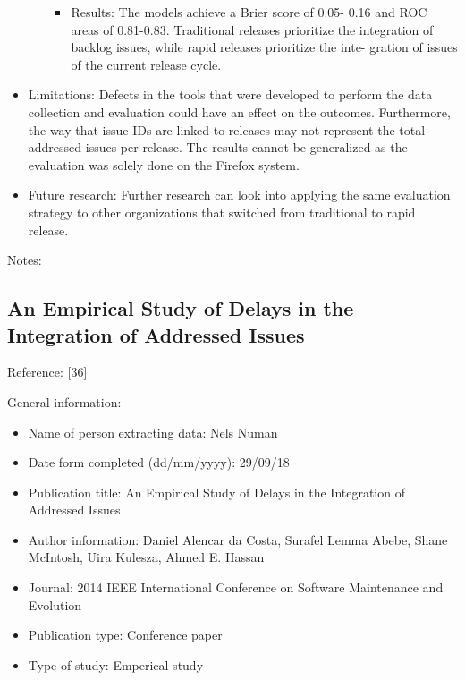 \documentclass[]{book}
\providecommand{\tightlist}{%
  \setlength{\itemsep}{0pt}\setlength{\parskip}{0pt}}
\begin{document}
\begin{itemize}
\begin{itemize}
    \begin{itemize}
    \tightlist
    \item
      Results: The models achieve a Brier score of 0.05- 0.16 and ROC
      areas of 0.81-0.83. Traditional releases prioritize the
      integration of backlog issues, while rapid releases prioritize the
      inte- gration of issues of the current release cycle.
    \end{itemize}
  \end{itemize}
\item
  Limitations: Defects in the tools that were developed to perform the
  data collection and evaluation could have an effect on the outcomes.
  Furthermore, the way that issue IDs are linked to releases may not
  represent the total addressed issues per release. The results cannot
  be generalized as the evaluation was solely done on the Firefox
  system.
\item
  Future research: Further research can look into applying the same
  evaluation strategy to other organizations that switched from
  traditional to rapid release.
\end{itemize}

Notes:

\subsection{An Empirical Study of Delays in the Integration of Addressed
Issues}\label{an-empirical-study-of-delays-in-the-integration-of-addressed-issues}

Reference: {[}\protect\hyperlink{ref-da2014a}{36}{]}

General information:

\begin{itemize}
\tightlist
\item
  Name of person extracting data: Nels Numan
\item
  Date form completed (dd/mm/yyyy): 29/09/18
\item
  Publication title: An Empirical Study of Delays in the Integration of
  Addressed Issues
\item
  Author information: Daniel Alencar da Costa, Surafel Lemma Abebe,
  Shane McIntosh, Uira Kulesza, Ahmed E. Hassan
\item
  Journal: 2014 IEEE International Conference on Software Maintenance
  and Evolution
\item
  Publication type: Conference paper
\item
  Type of study: Emperical study
\end{itemize}
\end{document}
